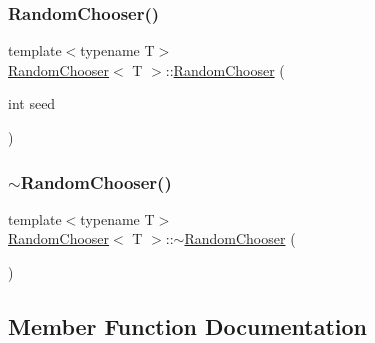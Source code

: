 \mbox{\label{class_random_chooser_ad00497640186ada99d3c3a93a3b6e3c6}} 
\subsubsection{\texorpdfstring{Random\+Chooser()}{RandomChooser()}\hspace{0.1cm}{\footnotesize\ttfamily [2/2]}}
{\footnotesize\ttfamily template$<$typename T$>$ \\
\hyperlink{class_random_chooser}{Random\+Chooser}$<$ T $>$\+::\hyperlink{class_random_chooser}{Random\+Chooser} (\begin{DoxyParamCaption}\item[{int}]{seed }\end{DoxyParamCaption})\hspace{0.3cm}{\ttfamily [inline]}}

\mbox{\label{class_random_chooser_a50ed6ba072b601166e6f28008316c5a7}} 
\subsubsection{\texorpdfstring{$\sim$\+Random\+Chooser()}{~RandomChooser()}}
{\footnotesize\ttfamily template$<$typename T$>$ \\
\hyperlink{class_random_chooser}{Random\+Chooser}$<$ T $>$\+::$\sim$\hyperlink{class_random_chooser}{Random\+Chooser} (\begin{DoxyParamCaption}{ }\end{DoxyParamCaption})\hspace{0.3cm}{\ttfamily [inline]}}



\subsection{Member Function Documentation}
\mbox{\label{class_random_chooser_a144e0b8285d6873f1549986348cd81a6}} 
